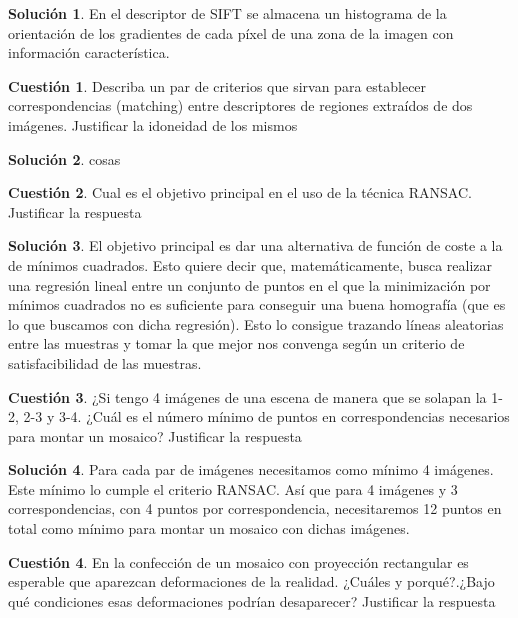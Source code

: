 \documentclass[a4paper, 11pt]{article}
\theoremstyle{definition}
\newtheorem{cuestion}{Cuestión}
\newtheorem*{solucion}{Solución}
\begin{document}
  \begin{solucion}
     	En el descriptor de SIFT se almacena un histograma de la orientación de los
      gradientes de cada píxel de una zona de la imagen con información característica.
  \end{solucion}

  \begin{cuestion}
    Describa un par de criterios que sirvan para establecer correspondencias
    (matching) entre descriptores de regiones extraídos de dos imágenes. Justificar
    la idoneidad de los mismos
  \end{cuestion}

  \begin{solucion}
     	cosas
  \end{solucion}

  \begin{cuestion}
    Cual es el objetivo principal en el uso de la técnica RANSAC. Justificar
    la respuesta
  \end{cuestion}

  \begin{solucion}
     	El objetivo principal es dar una alternativa de función de coste a la de mínimos
      cuadrados. Esto quiere decir que, matemáticamente, busca realizar una regresión
      lineal entre un conjunto de puntos en el que la minimización por mínimos cuadrados
      no es suficiente para conseguir una buena homografía (que es lo que buscamos con
      dicha regresión). Esto lo consigue trazando líneas aleatorias entre las muestras
      y tomar la que mejor nos convenga según un criterio de satisfacibilidad de las muestras.
  \end{solucion}
  \begin{cuestion}
    ¿Si tengo 4 imágenes de una escena de manera que se solapan la 1-2, 2-3
    y 3-4. ¿Cuál es el número mínimo de puntos en correspondencias necesarios para
    montar un mosaico? Justificar la respuesta
  \end{cuestion}

  \begin{solucion}
     	Para cada par de imágenes necesitamos como mínimo 4 imágenes. Este mínimo lo
      cumple el criterio RANSAC. Así que para 4 imágenes y 3 correspondencias, con
      4 puntos por correspondencia, necesitaremos 12 puntos en total como mínimo
      para montar un mosaico con dichas imágenes.
  \end{solucion}

  \begin{cuestion}
    En la confección de un mosaico con proyección rectangular es esperable
   que aparezcan deformaciones de la realidad. ¿Cuáles y porqué?.¿Bajo qué
   condiciones esas deformaciones podrían desaparecer? Justificar la respuesta

  \end{cuestion}
\end{document}
